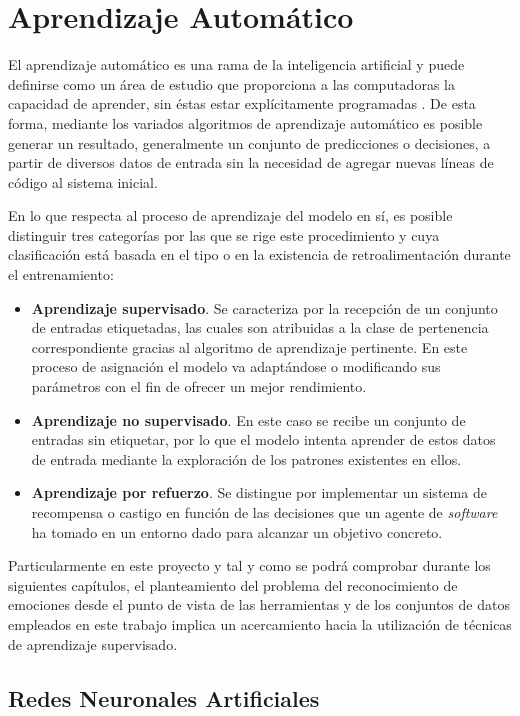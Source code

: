 \section{Aprendizaje Automático}

El aprendizaje automático es una rama de la inteligencia artificial y puede definirse como un área de estudio que proporciona a las computadoras la capacidad de aprender, sin éstas estar explícitamente programadas \cite{MachineLearning}. De esta forma, mediante los variados algoritmos de aprendizaje automático es posible generar un resultado, generalmente un conjunto de predicciones o decisiones, a partir de diversos datos de entrada sin la necesidad de agregar nuevas líneas de código al sistema inicial.

En lo que respecta al proceso de aprendizaje del modelo en sí, es posible distinguir tres categorías por las que se rige este procedimiento y cuya clasificación está basada en el tipo o en la existencia de retroalimentación durante el entrenamiento:
\begin{itemize}
  \item \textbf{Aprendizaje supervisado}. Se caracteriza por la recepción de un conjunto de entradas etiquetadas, las cuales son atribuidas a la clase de pertenencia correspondiente gracias al algoritmo de aprendizaje pertinente. En este proceso de asignación el modelo va adaptándose o modificando sus parámetros con el fin de ofrecer un mejor rendimiento.
  \item \textbf{Aprendizaje no supervisado}. En este caso se recibe un conjunto de entradas sin etiquetar, por lo que el modelo intenta aprender de estos datos de entrada mediante la exploración de los patrones existentes en ellos.
  \item \textbf{Aprendizaje por refuerzo}. Se distingue por implementar un sistema de recompensa o castigo en función de las decisiones que un agente de \textit{software} ha tomado en un entorno dado para alcanzar un objetivo concreto.
\end{itemize}

Particularmente en este proyecto y tal y como se podrá comprobar durante los siguientes capítulos, el planteamiento del problema del reconocimiento de emociones desde el punto de vista de las herramientas y de los conjuntos de datos empleados en este trabajo implica un acercamiento hacia la utilización de técnicas de aprendizaje supervisado.

\subsection{Redes Neuronales Artificiales} \label{Chapter:ANN}

